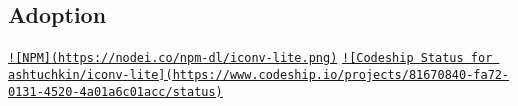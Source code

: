 \subsection*{Adoption}

\href{https://nodei.co/npm/iconv-lite/}{\tt !\mbox{[}N\+P\+M\mbox{]}(https\+://nodei.\+co/npm-\/dl/iconv-\/lite.\+png)} \href{https://www.codeship.io/projects/29053}{\tt !\mbox{[}Codeship Status for ashtuchkin/iconv-\/lite\mbox{]}(https\+://www.\+codeship.\+io/projects/81670840-\/fa72-\/0131-\/4520-\/4a01a6c01acc/status)} 
